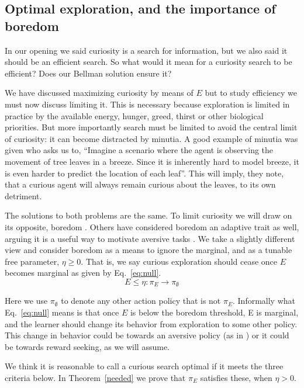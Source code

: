 \subsection{Optimal exploration, and the importance of boredom}
In our opening we said curiosity is a search for information, but we also said it should be an efficient search. So what would it mean for a curiosity search  to be efficient? Does our Bellman solution ensure it?

We have discussed maximizing curiosity by means of $E$ but to study efficiency we must now discuss limiting it. This is necessary because exploration is limited in practice by the available energy, hunger, greed, thirst or other biological priorities. But more importantly search must be limited to avoid the central limit of curiosity: it can become distracted by minutia. A good example of minutia was given \cite{Pathak2017} who asks us to, ``Imagine a scenario where the agent is observing the movement of tree leaves in a breeze. Since it is inherently hard to model breeze, it is even harder to predict the location of each leaf''. This will imply, they note, that a curious agent will always remain curious about the leaves, to its own detriment. 

The solutions to both problems are the same. To limit curiosity we will draw on its opposite, boredom \cite{Schmidhuber1991}. Others have considered boredom an adaptive trait as well, arguing it is a useful way to motivate aversive tasks \cite{Bench2013}. We take a slightly different view and consider boredom as a means to ignore the marginal, and as a tunable free parameter, $\eta \ge 0$. That is, we say curious exploration should cease once $E$ becomes marginal as given by Eq.~\ref{eq:null}. 
\begin{equation}
	\label{eq:null}
	E \le \eta : \pi_E \rightarrow \pi_{\emptyset}
\end{equation}

Here we use $\pi_{\emptyset}$ to denote any other action policy that is not $\pi_E$. Informally what Eq.~\ref{eq:null} means is that once $E$ is below the boredom threshold, E is marginal, and the learner should change its behavior from exploration to some other policy. This change in behavior could be towards an aversive policy (as in \cite{Bench2013}) or it could be towards reward seeking, as we will assume.

We think it is reasonable to call a curious search optimal if it meets the three criteria below. In Theorem~\ref{needed} we prove that $\pi_E$ satisfies these, when $\eta > 0$.

